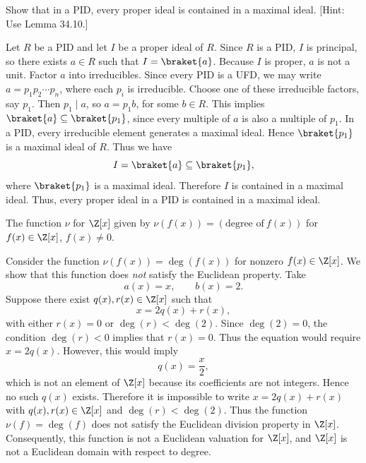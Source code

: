 \begin{problem}[34.30]
  Show that in a PID, every proper ideal is contained in a maximal ideal. [Hint: Use Lemma 34.10.]
\end{problem}

\begin{solution}
  Let $R$ be a PID and let $I$ be a proper ideal of $R$. Since $R$ is a PID, $I$ is principal, so there exists $a \in R$ such that $I = \braket{a}$. Because $I$ is proper, $a$ is not a unit. Factor $a$ into irreducibles. Since every PID is a UFD, we may write $a = p_1 p_2 \cdots p_n$, where each $p_i$ is irreducible. Choose one of these irreducible factors, say $p_1$. Then $p_1 \mid a$, so $a = p_1 b$, for some $b \in R$. This implies $\braket{a} \subseteq \braket{p_1}$, since every multiple of $a$ is also a multiple of $p_1$. In a PID, every irreducible element generates a maximal ideal. Hence $\braket{p_1}$ is a maximal ideal of $R$. Thus we have
  \[%
    I = \braket{a} \subseteq \braket{p_1}
  ,\]%
  where $\braket{p_1}$ is a maximal ideal. Therefore $I$ is contained in a maximal ideal. Thus, every proper ideal in a PID is contained in a maximal ideal.
\end{solution}

\begin{problem}[35.2]
  The function $\nu$ for $\Z[x]$ given by $\nu(f(x)) = (\text{degree of}~f(x))$ for $f(x) \in \Z[x]$, $f(x) \ne 0$.
\end{problem}

\begin{solution}
  Consider the function $\nu(f(x)) = \deg(f(x))$ for nonzero $f(x) \in \Z[x]$. We show that this function does \emph{not} satisfy the Euclidean property. Take
  \[%
    a(x) = x, \qquad b(x) = 2
  .\]%
  Suppose there exist $q(x), r(x) \in \Z[x]$ such that
  \[%
    x = 2q(x) + r(x)
  ,\]%
  with either $r(x) = 0$ or $\deg(r) < \deg(2)$. Since $\deg(2) = 0$, the condition $\deg(r) < 0$ implies that $r(x)=0$. Thus the equation would require $x = 2q(x)$. However, this would imply
  \[%
    q(x) = \frac{x}{2}
  ,\]%
  which is not an element of $\Z[x]$ because its coefficients are not integers. Hence no such $q(x)$ exists. Therefore it is impossible to write $x = 2q(x) + r(x)$ with $q(x), r(x) \in \Z[x]$ and $\deg(r) < \deg(2)$. Thus the function $\nu(f) = \deg(f)$ does not satisfy the Euclidean division property in $\Z[x]$. Consequently, this function is not a Euclidean valuation for $\Z[x]$, and $\Z[x]$ is not a Euclidean domain with respect to degree.
\end{solution}

